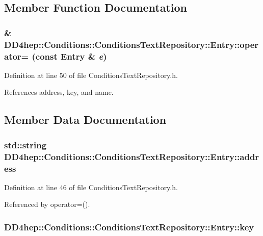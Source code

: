 \subsection{Member Function Documentation}
\hypertarget{class_d_d4hep_1_1_conditions_1_1_conditions_text_repository_1_1_entry_a16b49e4960ded6fa394dc3173f37dd4e}{
\subsubsection[{operator=}]{\& DD4hep::Conditions::ConditionsTextRepository::Entry::operator= (const {\bf Entry} \& {\em e})}}
\label{class_d_d4hep_1_1_conditions_1_1_conditions_text_repository_1_1_entry_a16b49e4960ded6fa394dc3173f37dd4e}


Definition at line 50 of file ConditionsTextRepository.h.

References address, key, and name.

\subsection{Member Data Documentation}
\hypertarget{class_d_d4hep_1_1_conditions_1_1_conditions_text_repository_1_1_entry_a29d5e08d84bea3989d09c5799f3f1393}{
\subsubsection[{address}]{\setlength{\rightskip}{0pt plus 5cm}std::string {\bf DD4hep::Conditions::ConditionsTextRepository::Entry::address}}}
\label{class_d_d4hep_1_1_conditions_1_1_conditions_text_repository_1_1_entry_a29d5e08d84bea3989d09c5799f3f1393}


Definition at line 46 of file ConditionsTextRepository.h.

Referenced by operator=().\hypertarget{class_d_d4hep_1_1_conditions_1_1_conditions_text_repository_1_1_entry_a46681700774cfba80ad2c32ea18dd8dd}{
\subsubsection[{key}]{ {\bf DD4hep::Conditions::ConditionsTextRepository::Entry::key}}}
\label{class_d_d4hep_1_1_conditions_1_1_conditions_text_repository_1_1_entry_a46681700774cfba80ad2c32ea18dd8dd}


